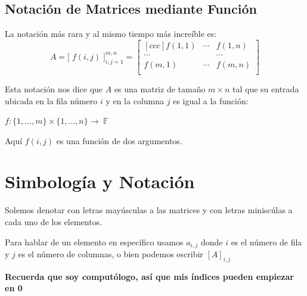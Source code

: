 \documentclass[12pt, fleqn]{report}                             %
\theoremstyle{break}                                            %
\DeclareMathOperator \GenericField {\mathbb{F}}                 %
\newcommand{\BigBrackets}[1]    {\Big[ \; #1 \; \Big]}          %
\begin{document}
            \subsection{Notación de Matrices mediante Función}

                La notación más rara y al mismo tiempo más increíble es:
                \begin{equation*}
                    A   
                        = \BigBrackets{ f(i,j) }_{i, j = 1}^{m, n}
                        =
                        \begin{bmatrix}[ccc]
                            f(1,1)  & \cdots & f(1,n)   \\
                            \cdots  &        & \cdots   \\
                            f(m, 1) & \cdots & f(m,n)   \\
                        \end{bmatrix}
                \end{equation*}

                Esta notación nos dice que $A$ es una matriz de tamaño $m \times n$ tal
                que su entrada ubicada en la fila número $i$ y en la columna $j$ es igual
                a la función: 

                $f: \{1, \dots, m\} \times \{1, \dots, n\} \to \GenericField$
                
                Aquí $f(i, j)$ es una función de dos argumentos.


        \vspace{1em}
        \section{Simbología y Notación}

            Solemos denotar con letras mayúsculas a las matrices y con letras miniscúlas
            a cada uno de los elementos.

            Para hablar de un elemento en específico usamos $a_{i,j}$ donde $i$ es el
            número de fila y $j$ es el número de columnas, o bien podemos escribir $[A]_{i,j}$

            \textbf{Recuerda que soy computólogo, así que mis índices pueden empiezar en 0}
\end{document}
